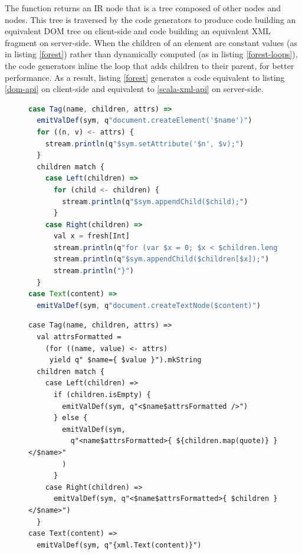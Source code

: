 \documentclass[preprint]{sigplanconf}
\begin{document}
The  function returns an  IR node that is a tree composed of other
 nodes and  nodes. This tree is traversed by the code generators to produce
code building an equivalent DOM tree on client-side and code building an equivalent XML fragment on
server-side. When the children of an element are constant values (as in listing \ref{forest}) rather
than dynamically computed (as in listing \ref{forest-loops}), the code generators inline the loop
that adds children to their parent, for better performance. As a result, listing \ref{forest}
generates a code equivalent to listing \ref{dom-api} on client-side and equivalent to
\ref{scala-xml-api} on server-side.

\begin{figure}
\begin{lstlisting}[language=JavaScript,label=js-gen-forest,caption=JavaScript code generator for the
DOM fragment
definition DSL,captionpos=b]
case Tag(name, children, attrs) =>
  emitValDef(sym, q"document.createElement('$name')")
  for ((n, v) <- attrs) {
    stream.println(q"$sym.setAttribute('$n', $v);")
  }
  children match {
    case Left(children) =>
      for (child <- children) {
        stream.println(q"$sym.appendChild($child);")
      }
    case Right(children) =>
      val x = fresh[Int]
      stream.println(q"for (var $x = 0; $x < $children.length; $x++) {")
      stream.println(q"$sym.appendChild($children[$x]);")
      stream.println("}")
  }
case Text(content) =>
  emitValDef(sym, q"document.createTextNode($content)")
\end{lstlisting}
\end{figure}

\begin{figure}
\begin{lstlisting}[label=scala-gen-forest,caption=Scala code generator for the DOM fragment
definition DSL,captionpos=b]
case Tag(name, children, attrs) =>
  val attrsFormatted =
    (for ((name, value) <- attrs)
     yield q" $name={ $value }").mkString
  children match {
    case Left(children) =>
      if (children.isEmpty) {
        emitValDef(sym, q"<$name$attrsFormatted />")
      } else {
        emitValDef(sym,
          q"<name$attrsFormatted>{ ${children.map(quote)} }</$name>"
        )
      }
    case Right(children) =>
      emitValDef(sym, q"<$name$attrsFormatted>{ $children }</$name>")
  }
case Text(content) =>
  emitValDef(sym, q"{xml.Text(content)}")
\end{lstlisting}
\end{figure}
\end{document}
